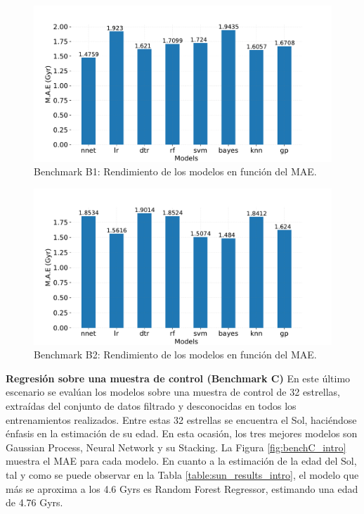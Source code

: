 \begin{figure}[H]
\begin{center}
 \includegraphics[width=0.8\linewidth]{Figuras/Experimentos/B_B1_models.pdf}
\end{center}
\caption{Benchmark B1: Rendimiento de los modelos en función del MAE.}
 \label{fig:benchB1_intro}
\end{figure}

\begin{figure}[H]
\begin{center}
 \includegraphics[width=0.8\linewidth]{Figuras/Experimentos/B_B2_models.pdf}
\end{center}
\caption{Benchmark B2: Rendimiento de los modelos en función del MAE.}
 \label{fig:benchB2_intro}
\end{figure}

\vspace{0.25cm}

\textbf{Regresión sobre una muestra de control (Benchmark C)} {} En este último escenario se evalúan los modelos sobre una muestra de control de 32 estrellas, extraídas del conjunto de datos filtrado y desconocidas en todos los entrenamientos realizados. Entre estas 32 estrellas se encuentra el Sol, haciéndose énfasis en la estimación de su edad. En esta ocasión, los tres mejores modelos son Gaussian Process, Neural Network y su Stacking. La Figura \ref{fig:benchC_intro} muestra el MAE para cada modelo. En cuanto a la estimación de la edad del Sol, tal y como se puede observar en la Tabla \ref{table:sun_results_intro}, el modelo que más se aproxima a los 4.6 Gyrs es Random Forest Regressor, estimando una edad de 4.76 Gyrs.

